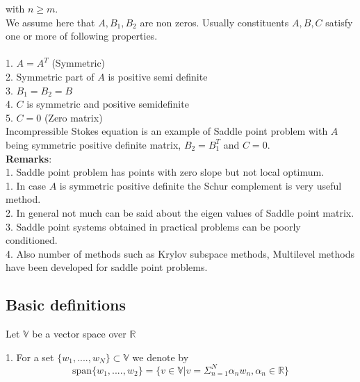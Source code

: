 \documentclass[a4paper,12pt]{book}
\begin{document}
with $n \geq m$.\\

We assume here that $A, B_1, B_2$ are non zeros. Usually constituents $A,B,C$ satisfy one or more of following properties.
\\
\\
1. $A = A^T$ (Symmetric)\\
2. Symmetric part of $A$ is positive semi definite\\
3. $B_1 = B_2 = B$\\
4. $C$ is symmetric and positive semidefinite\\
5. $C = 0$ (Zero matrix)\\

Incompressible Stokes equation is an example of Saddle point problem with $A$ being symmetric positive definite matrix, $B_2 = B_1^T$ and $C = 0$. \\

\textbf{Remarks}:\\

1. Saddle point problem has points with zero slope but not local optimum.\\

1. In case $A$ is symmetric positive definite the Schur complement is very useful method.\\

2. In general not much can be said about the eigen values of Saddle point matrix.\\ 

3. Saddle point systems obtained in practical problems can be poorly conditioned.\\

4. Also number of methods such as Krylov subspace methods, Multilevel methods have been developed for saddle point problems.\\

\subsection{Basic definitions}\cite{crbm}

Let $\mathbb{V}$ be a vector space over $\mathbb{R}$

1. For a set $\lbrace w_1,....,w_N \rbrace \subset \mathbb{V}$ we denote by \\
\begin{equation} \label{vector space}
\mathrm{span} \lbrace w_1,....,w_2 \rbrace = \lbrace v \in \mathbb{V} | v = \Sigma_{n=1}^N \alpha_n w_n, \alpha_n \in \mathbb{R} \rbrace
\end{equation} 
\end{document}
